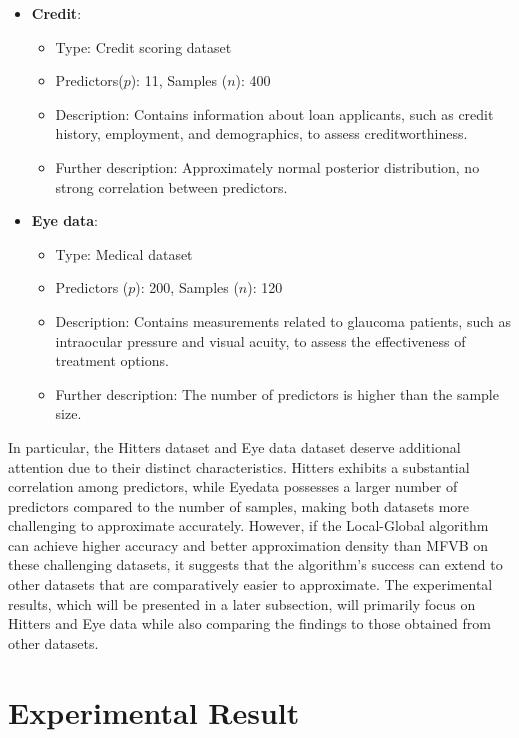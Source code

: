 \begin{itemize}
	\item \textbf{Credit}:
	\begin{itemize}
		\item Type: Credit scoring dataset
		\item Predictors($p$): 11, Samples ($n$): 400
		\item Description: Contains information about loan applicants, such as credit history, employment, and demographics, to assess creditworthiness.
		\item Further description: Approximately normal posterior distribution, no strong correlation between predictors.
	\end{itemize}
	
	\item \textbf{Eye data}:
	\begin{itemize}
		\item Type: Medical dataset
		\item Predictors ($p$): 200, Samples ($n$): 120
		\item Description: Contains measurements related to glaucoma patients, such as intraocular pressure and visual acuity, to assess the effectiveness of treatment options.
		\item Further description: The number of predictors is higher than the sample size.
	\end{itemize}
\end{itemize}
In particular, the Hitters dataset and Eye data dataset deserve additional attention due to their distinct characteristics. Hitters exhibits a substantial correlation among predictors, while Eyedata possesses a larger number of predictors compared to the number of samples, making both datasets more challenging to approximate accurately. However, if the Local-Global algorithm can achieve higher accuracy and better approximation density than MFVB on these challenging datasets, it suggests that the algorithm's success can extend to other datasets that are comparatively easier to approximate. The experimental results, which will be presented in a later subsection, will primarily focus on Hitters and Eye data while also comparing the findings to those obtained from other datasets.

\section{Experimental Result}
